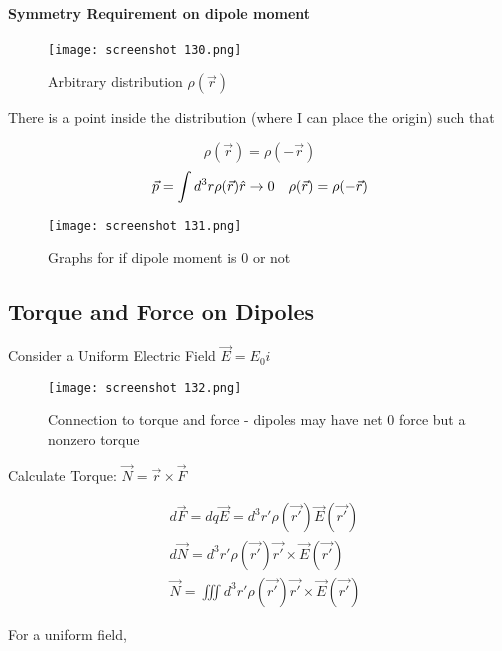 \documentclass[svgnames]{article}   	%
\begin{document}
\paragraph{Symmetry Requirement on dipole moment} 

\begin{figure}[H]
  \centering
    \texttt{[image: screenshot 130.png]}
    \caption{Arbitrary distribution $\rho(\vec{r})$}
\end{figure}



There is a point inside the distribution (where I can place the origin) such
that 

\[
  \rho(\vec{r}) = \rho(-\vec{r}) 
\]
\[
\vec{p} = \int d^3r \rho(\vec{r}) \hat{r} \rightarrow 0 \hspace{10px}
\rho(\vec{r}) = \rho(-\vec{r})
\]

\begin{figure}[H]
  \centering
    \texttt{[image: screenshot 131.png]}
    \caption{Graphs for if dipole moment is 0 or not}
\end{figure}




\subsection{Torque and Force on Dipoles}


Consider a Uniform Electric Field $\vec{E} = E_0 \hat{i}$ \\

\begin{figure}[H]
  \centering
    \texttt{[image: screenshot 132.png]}
    \caption{Connection to torque and force - dipoles may have net 0 force but
    a nonzero torque}
\end{figure}



Calculate Torque: $\vec{N} = \vec{r} \times \vec{F}$


\begin{align*}
  &d\vec{F} = dq \vec{E} = d^3r' \rho(\vec{r'}) \vec{E}(\vec{r'}) \\
  &d\vec{N} = d^3r' \rho(\vec{r'}) \vec{r'} \times \vec{E}(\vec{r'}) \\
  &\vec{N} = \iiint d^3 r' \rho(\vec{r'}) \vec{r'} \times \vec{E}(\vec{r'})
\end{align*}

For a uniform field, 
\end{document}

